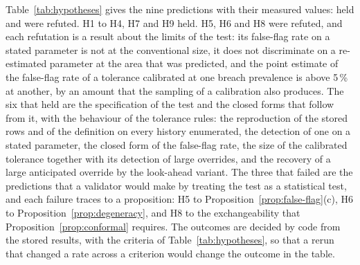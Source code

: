 Table~\ref{tab:hypotheses} gives the nine predictions with their measured values: \hypothesesHeld{} held and \hypothesesRefuted{} were refuted. H1 to H4, H7 and H9 held. H5, H6 and H8 were refuted, and each refutation is a result about the limits of the test: its false-flag rate on a stated parameter is not at the conventional size, it does not discriminate on a re-estimated parameter at the area that was predicted, and the point estimate of the false-flag rate of a tolerance calibrated at one breach prevalence is above 5\,\% at another, by an amount that the sampling of a calibration also produces. The six that held are the specification of the test and the closed forms that follow from it, with the behaviour of the tolerance rules: the reproduction of the stored rows and of the definition on every history enumerated, the detection of one on a stated parameter, the closed form of the false-flag rate, the size of the calibrated tolerance together with its detection of large overrides, and the recovery of a large anticipated override by the look-ahead variant. The three that failed are the predictions that a validator would make by treating the test as a statistical test, and each failure traces to a proposition: H5 to Proposition~\ref{prop:false-flag}(c), H6 to Proposition~\ref{prop:degeneracy}, and H8 to the exchangeability that Proposition~\ref{prop:conformal} requires. The outcomes are decided by code from the stored results, with the criteria of Table~\ref{tab:hypotheses}, so that a rerun that changed a rate across a criterion would change the outcome in the table.



